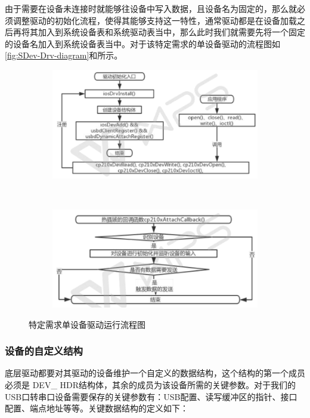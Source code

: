 	由于需要在设备未连接时就能够往设备中写入数据，且设备名为固定的，那么就必须调整驱动的初始化流程，使得其能够支持这一特性，通常驱动都是在设备加载之后再将其加入到系统设备表和系统驱动表当中，那么此时我们就需要先将一个固定的设备名加入到系统设备表当中。对于该特定需求的单设备驱动的流程图如\autoref{fig:SDev-Drv-diagram}和所示。
\begin{figure}[h]
\centering
  \begin{subfigure}[b]{1.0\textwidth}
  \includegraphics[width=\textwidth]{./graphics/SDev-Drv-Diagram-a.pdf}
  \caption{}\label{fig:SDevice-Driver-diagram-a}
  \end{subfigure}
  ~
  \begin{subfigure}[b]{1.0\textwidth}
  \includegraphics[width=\textwidth]{./graphics/SDev-Drv-Diagram-b.pdf}
  \caption{}\label{fig:SDevice-Driver-diagram-b}
  \end{subfigure}
\caption{特定需求单设备驱动运行流程图}\label{fig:SDev-Drv-diagram}
\end{figure}




\subsubsection{设备的自定义结构}
	底层驱动都要对其驱动的设备维护一个自定义的数据结构，这个结构的第一个成员必须是
	DEV\_ HDR结构体，其余的成员为该设备所需的关键参数。对于我们的USB口转串口设备需要保存的关键参数有：USB配置、读写缓冲区的指针、接口配置、端点地址等等。关键数据结构的定义如下： 
	

